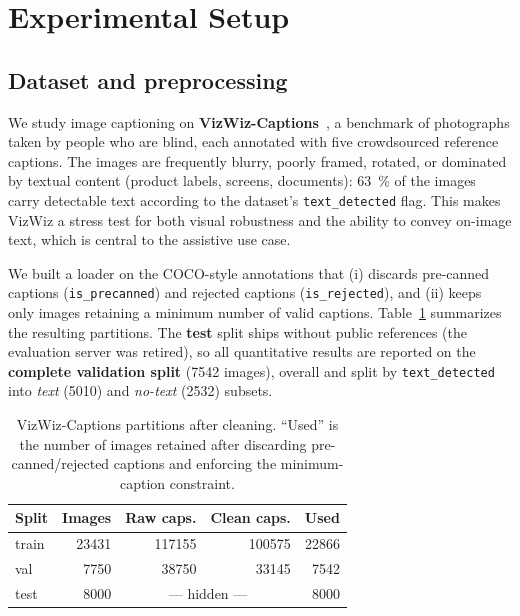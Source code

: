 
\section{Experimental Setup}
\label{sec:setup}

\subsection{Dataset and preprocessing}
\label{sec:data}
We study image captioning on \textbf{VizWiz-Captions}~\cite{vizwiz}, a benchmark of
photographs taken by people who are blind, each annotated with five
crowdsourced reference captions. The images are frequently blurry, poorly framed,
rotated, or dominated by textual content (product labels, screens, documents):
\SI{63}{\percent} of the images carry detectable text according to the dataset's
\texttt{text\_detected} flag. This makes VizWiz a stress test for both visual
robustness and the ability to convey on-image text, which is central to the
assistive use case.

We built a loader on the COCO-style annotations that (i) discards pre-canned
captions (\texttt{is\_precanned}) and rejected captions (\texttt{is\_rejected}),
and (ii) keeps only images retaining a minimum number of valid captions.
Table~\ref{tab:data} summarizes the resulting partitions. The \textbf{test} split
ships without public references (the evaluation server was retired), so all
quantitative results are reported on the \textbf{complete validation split}
(\num{7542} images), overall and split by \texttt{text\_detected} into
\emph{text} (\num{5010}) and \emph{no-text} (\num{2532}) subsets.

\begin{table}[t]
\centering
\caption{VizWiz-Captions partitions after cleaning. ``Used'' is the number of
images retained after discarding pre-canned/rejected captions and enforcing the
minimum-caption constraint.}
\label{tab:data}
\begin{tabular}{lrrrr}
\toprule
Split & Images & Raw caps. & Clean caps. & Used \\
\midrule
train & \num{23431} & \num{117155} & \num{100575} & \num{22866} \\
val   & \num{7750}  & \num{38750}  & \num{33145}  & \num{7542}  \\
test  & \num{8000}  & \multicolumn{2}{c}{--- hidden ---} & \num{8000} \\
\bottomrule
\end{tabular}
\end{table}


